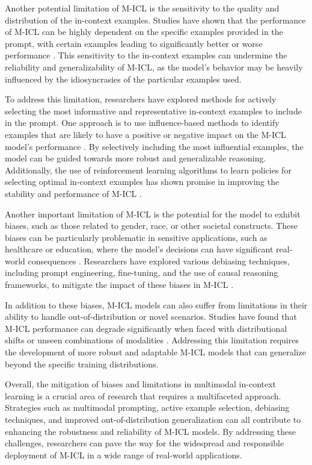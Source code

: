 \documentclass[11pt]{article}
\begin{document}
Another potential limitation of M-ICL is the sensitivity to the quality and distribution of the in-context examples. Studies have shown that the performance of M-ICL can be highly dependent on the specific examples provided in the prompt, with certain examples leading to significantly better or worse performance \cite{ref303,ref304}. This sensitivity to the in-context examples can undermine the reliability and generalizability of M-ICL, as the model's behavior may be heavily influenced by the idiosyncrasies of the particular examples used.

To address this limitation, researchers have explored methods for actively selecting the most informative and representative in-context examples to include in the prompt. One approach is to use influence-based methods to identify examples that are likely to have a positive or negative impact on the M-ICL model's performance \cite{ref303}. By selectively including the most influential examples, the model can be guided towards more robust and generalizable reasoning. Additionally, the use of reinforcement learning algorithms to learn policies for selecting optimal in-context examples has shown promise in improving the stability and performance of M-ICL \cite{ref305}.

Another important limitation of M-ICL is the potential for the model to exhibit biases, such as those related to gender, race, or other societal constructs. These biases can be particularly problematic in sensitive applications, such as healthcare or education, where the model's decisions can have significant real-world consequences \cite{ref306}. Researchers have explored various debiasing techniques, including prompt engineering, fine-tuning, and the use of causal reasoning frameworks, to mitigate the impact of these biases in M-ICL \cite{ref307,ref251}.

In addition to these biases, M-ICL models can also suffer from limitations in their ability to handle out-of-distribution or novel scenarios. Studies have found that M-ICL performance can degrade significantly when faced with distributional shifts or unseen combinations of modalities \cite{ref308}. Addressing this limitation requires the development of more robust and adaptable M-ICL models that can generalize beyond the specific training distributions.

Overall, the mitigation of biases and limitations in multimodal in-context learning is a crucial area of research that requires a multifaceted approach. Strategies such as multimodal prompting, active example selection, debiasing techniques, and improved out-of-distribution generalization can all contribute to enhancing the robustness and reliability of M-ICL models. By addressing these challenges, researchers can pave the way for the widespread and responsible deployment of M-ICL in a wide range of real-world applications.
\end{document}
